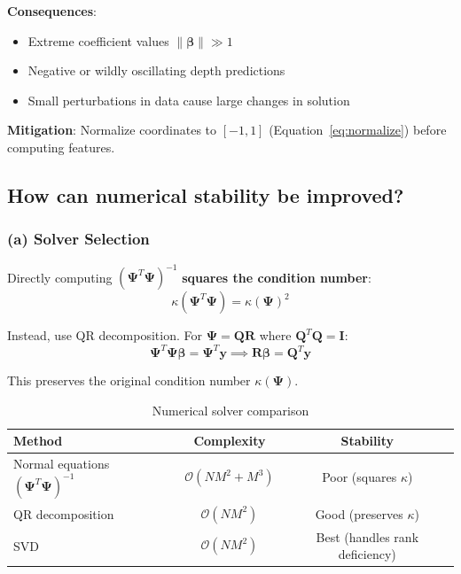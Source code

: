 \documentclass[11pt,a4paper]{article}
\begin{document}
\textbf{Consequences}:
\begin{itemize}[noitemsep]
    \item Extreme coefficient values $\|\boldsymbol{\beta}\| \gg 1$
    \item Negative or wildly oscillating depth predictions
    \item Small perturbations in data cause large changes in solution
\end{itemize}

\textbf{Mitigation}: Normalize coordinates to $[-1, 1]$ (Equation~\ref{eq:normalize}) before computing features.

\subsection{How can numerical stability be improved?}

\subsubsection{(a) Solver Selection}

Directly computing $(\boldsymbol{\Psi}^T\boldsymbol{\Psi})^{-1}$ \textbf{squares the condition number}:
\begin{equation}
\kappa(\boldsymbol{\Psi}^T\boldsymbol{\Psi}) = \kappa(\boldsymbol{\Psi})^2
\end{equation}

Instead, use QR decomposition. For $\boldsymbol{\Psi} = \mathbf{Q}\mathbf{R}$ where $\mathbf{Q}^T\mathbf{Q} = \mathbf{I}$:
\begin{equation}
\boldsymbol{\Psi}^T\boldsymbol{\Psi}\boldsymbol{\beta} = \boldsymbol{\Psi}^T\mathbf{y} \implies \mathbf{R}\boldsymbol{\beta} = \mathbf{Q}^T\mathbf{y}
\end{equation}

This preserves the original condition number $\kappa(\boldsymbol{\Psi})$.

\begin{table}[h]
\centering
\caption{Numerical solver comparison}
\begin{tabular}{lcc}
\toprule
\textbf{Method} & \textbf{Complexity} & \textbf{Stability} \\
\midrule
Normal equations $(\boldsymbol{\Psi}^T\boldsymbol{\Psi})^{-1}$ & $\mathcal{O}(NM^2 + M^3)$ & Poor (squares $\kappa$) \\
QR decomposition & $\mathcal{O}(NM^2)$ & Good (preserves $\kappa$) \\
SVD & $\mathcal{O}(NM^2)$ & Best (handles rank deficiency) \\
\bottomrule
\end{tabular}
\end{table}
\end{document}
